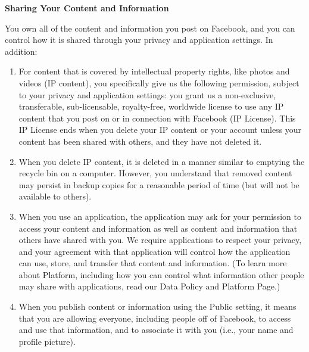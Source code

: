 \begin{appendices}
\begin{quote_tos}
        \vspace{\baselineskip}

        \textbf{Sharing Your Content and Information}

        You own all of the content and information you post on Facebook, and you can control 
        how it is shared through your privacy and application settings. In addition:

        \begin{enumerate}
            \item For content that is covered by intellectual property rights, like photos 
            and videos (IP content), you specifically give us the following permission, 
            subject to your privacy and application settings: you grant us a non-exclusive, 
            transferable, sub-licensable, royalty-free, worldwide license to use any IP 
            content that you post on or in connection with Facebook (IP License). This IP 
            License ends when you delete your IP content or your account unless your content 
            has been shared with others, and they have not deleted it.
    
            \item When you delete IP content, it is deleted in a manner similar to emptying 
            the recycle bin on a computer. However, you understand that removed content 
            may persist in backup copies for a reasonable period of time (but will not be 
            available to others).
    
            \item When you use an application, the application may ask for your permission 
            to access your content and information as well as content and information that 
            others have shared with you.  We require applications to respect your privacy, 
            and your agreement with that application will control how the application can 
            use, store, and transfer that content and information.  (To learn more about 
            Platform, including how you can control what information other people may share 
            with applications, read our Data Policy and Platform Page.)
    
            \item When you publish content or information using the Public setting, it means 
            that you are allowing everyone, including people off of Facebook, to access 
            and use that information, and to associate it with you (i.e., your name and 
            profile picture).
    

\end{enumerate}
\end{quote_tos}
\end{appendices}
